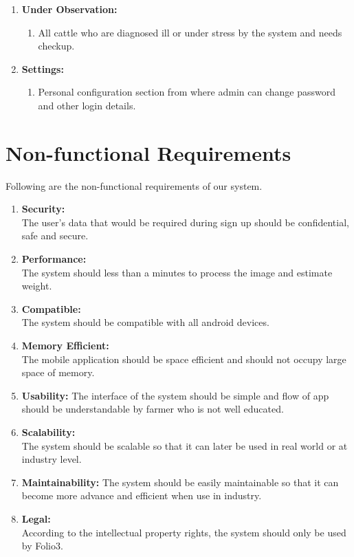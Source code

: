 \begin{enumerate}
	\item \textbf{Under Observation:}
	\begin{enumerate}
		\item All cattle who are diagnosed ill or under stress by the system and needs checkup. 
	\end{enumerate}
	
	\item \textbf{Settings:}
	\begin{enumerate}
		\item Personal configuration section from where admin can change password and other login details. 
	\end{enumerate}
	
\end{enumerate}




\section{Non-functional Requirements}

\hspace*{10mm} Following are the non-functional requirements of our system. 
\begin{enumerate}
	\item \textbf{Security:}\\
	The user's data that would be required during sign up should be confidential, safe and secure.
	\item \textbf{Performance:}\\
	The system should less than a minutes to process the image and estimate weight.
	\item \textbf{Compatible:}\\
	The system should be compatible with all android devices. 
	\item \textbf{Memory Efficient:}\\
	The mobile application should be space efficient and should not occupy large space of memory.
	\item \textbf{Usability:}
	The interface of the system should be simple and flow of app should be understandable by farmer who is not well educated. 
	\item \textbf{Scalability:}\\
	The system should be scalable so that it can later be used in real world or at industry level. 
	\item \textbf{Maintainability:}
	The system should be easily maintainable so that it can become more advance and efficient when use in industry. 
	\item \textbf{Legal:}\\
	According to the intellectual property rights, the system should only be used by Folio3. 
	
\end{enumerate}

